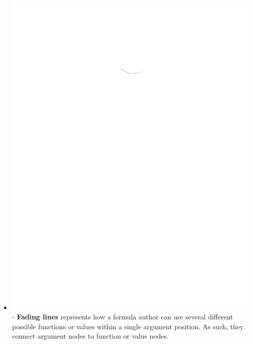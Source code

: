 \documentclass[conference]{IEEEtran}
\begin{document}
\begin{itemize}
		\item  \vspace{.25cm} \includegraphics{glossary-fadingline} - \textbf{Fading
			lines} represents how a formula author can use several different possible
		functions or values within a single argument position. As such, they connect
		argument nodes to function or value nodes.
		

\end{itemize}
\end{document}
